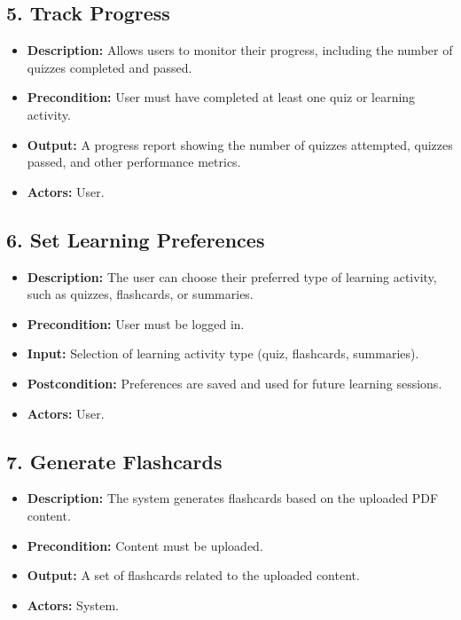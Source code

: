 \documentclass[a4paper,12pt]{article}
\begin{document}
\subsection*{5. Track Progress}
\begin{itemize}[left=0pt]
    \item \textbf{Description:} Allows users to monitor their progress, including the number of quizzes completed and passed.
    \item \textbf{Precondition:} User must have completed at least one quiz or learning activity.
    \item \textbf{Output:} A progress report showing the number of quizzes attempted, quizzes passed, and other performance metrics.
    \item \textbf{Actors:} User.
\end{itemize}

\subsection*{6. Set Learning Preferences}
\begin{itemize}[left=0pt]
    \item \textbf{Description:} The user can choose their preferred type of learning activity, such as quizzes, flashcards, or summaries.
    \item \textbf{Precondition:} User must be logged in.
    \item \textbf{Input:} Selection of learning activity type (quiz, flashcards, summaries).
    \item \textbf{Postcondition:} Preferences are saved and used for future learning sessions.
    \item \textbf{Actors:} User.
\end{itemize}

\subsection*{7. Generate Flashcards}
\begin{itemize}[left=0pt]
    \item \textbf{Description:} The system generates flashcards based on the uploaded PDF content.
    \item \textbf{Precondition:} Content must be uploaded.
    \item \textbf{Output:} A set of flashcards related to the uploaded content.
    \item \textbf{Actors:} System.
\end{itemize}
\end{document}
